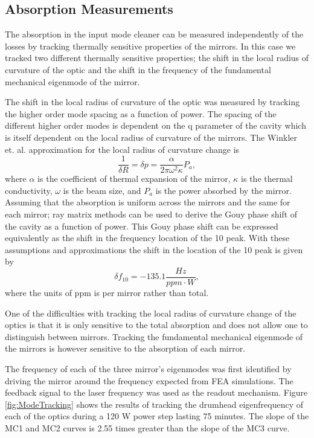 \subsection{Absorption Measurements}
\label{sec:absorption_measurements}

The absorption in the input mode cleaner can be measured independently of the losses 
by tracking thermally sensitive properties of the mirrors.  
In this case we tracked two different thermally sensitive properties; 
the shift in the local radius of curvature of the optic 
and the shift in the frequency of the fundamental mechanical eigenmode of the mirror.  

The shift in the local radius of curvature of the optic was measured by 
tracking the higher order mode spacing as a function of power.  
The spacing of the different higher order modes is dependent on the q 
parameter of the cavity which is itself dependent on the local radius of 
curvature of the mirrors.  
The Winkler et. al.\cite{winkler_heating_1991} approximation for the local radius of 
curvature change is
\begin{equation}
	\frac{1}{\delta R}=\delta p=\frac{\alpha}{2\pi\omega^2\kappa}P_a,
\end{equation}
where $\alpha$ is the coefficient of thermal expansion of the mirror,  
$\kappa$ is the thermal conductivity, $\omega$ is the beam size, and 
$P_a$ is the power absorbed by the mirror.  
Assuming that the absorption is uniform across the mirrors and the same for 
each mirror; ray matrix methods can be used to derive the Gouy phase shift 
of the cavity as a function of power.  
This Gouy phase shift can be expressed equivalently as the shift in the 
frequency location of the 10 peak.  
With these assumptions and approximations the shift in the location of the 10 
peak is given by 
\begin{equation}
	\delta f_{10}=-135.1 \frac{Hz}{ppm\cdot W},
\end{equation}
where the units of ppm is per mirror rather than total.

One of the difficulties with tracking the local radius of curvature change of 
the optics is that it is only sensitive to the total absorption and does not 
allow one to distinguish between mirrors.  
Tracking the fundamental mechanical eigenmode of the mirrors is however sensitive 
to the absorption of each mirror.  

The frequency of each of the three mirror's eigenmodes was first identified by 
driving the mirror around the frequency expected from FEA simulations.  
The feedback signal to the laser frequency was used as the readout mechanism.  
Figure \ref{fig:ModeTracking} shows the results of tracking the drumhead eigenfrequency 
of each of the optics during a 120 W power step lasting 75 minutes.  
The slope of the MC1 and MC2 curves is 2.55 times greater than the slope of the 
MC3 curve.  


